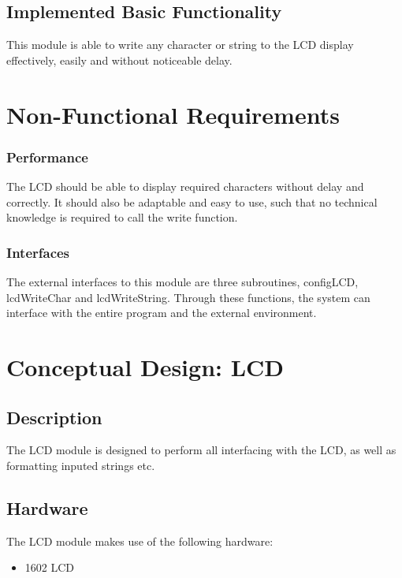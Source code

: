 \documentclass[]{report}
\begin{document}
\subsection{Implemented Basic Functionality}
This module is able to write any character or string to the LCD display effectively, easily and without noticeable delay.

\section{Non-Functional Requirements}

\subsubsection{Performance}
The LCD should be able to display required characters without delay and correctly. It should also be adaptable and easy to use, such that no technical knowledge is required to call the write function.

\subsubsection{Interfaces}
The external interfaces to this module are three subroutines, configLCD, lcdWriteChar and lcdWriteString. Through these functions, the system can interface with the entire program and the external environment.

\section{Conceptual Design: LCD}
\subsection{Description}
The LCD module is designed to perform all interfacing with the LCD, as well as formatting inputed strings etc.

\subsection{Hardware}
The LCD module makes use of the following hardware:
\begin{itemize}
	\item 1602 LCD
\end{itemize}
\end{document}
